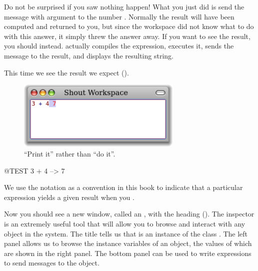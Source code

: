 \documentclass[a4paper,10pt,twoside]{book}
\begin{document}
Do not be surprised if you saw nothing happen! What you just did is send the message \ct{+} with argument  to the number . Normally the result  will have been computed and returned to you, but since the workspace did not know what to do with this answer, it simply threw the answer away.  If you want to see the result, you should  instead.  actually compiles the expression, executes it, sends the message  to the result, and displays the resulting string.

This time we see the result we expect ().

\begin{figure}[htb]
\centerline {\includegraphics[width=0.7\textwidth]{PrintIt}}
\caption{``Print it'' rather than ``do it''. \label{fig:printit}}
\end{figure}

\begin{code}{@TEST}
3 + 4 --> 7
\end{code}
\noindent
We use the notation \ct{-->} as a convention in this book to indicate that a particular \pharo expression yields a given result when you .

\noindent
Now you should see a new window, called an , with the heading  ().
The inspector is an extremely useful tool that will allow you to browse and interact with any object in the system.
The title tells us that  is an instance of the class .
The left panel allows us to browse the instance variables of an object, the values of which are shown in the right panel.
The bottom panel can be used to write expressions to send messages to the object.
\end{document}
